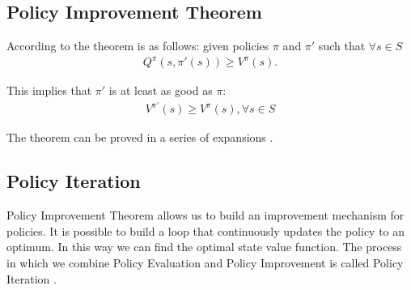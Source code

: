 \subsection{Policy Improvement Theorem}

According to \cite{lecture_dp} the theorem is as follows: given policies $\pi$ and $\pi'$ such that $\forall s \in S$
\begin{align}
    Q^{\pi}(s, \pi'(s)) \geq V^{\pi}(s).
\end{align}

This implies that $\pi'$ is at least as good as $\pi$:
\begin{align}
    V^{\pi'}(s) \geq V^{\pi}(s), \forall s \in S
\end{align}

The theorem can be proved in a series of expansions \cite{lecture_dp}.

\subsection{Policy Iteration}
Policy Improvement Theorem allows us to build an improvement mechanism for policies. It is possible to build a loop that
continuously updates the policy to an optimum. In this way we can find the optimal state value function. The process in which we combine Policy Evaluation and Policy Improvement is called Policy Iteration \cite{lecture_dp}.


 

